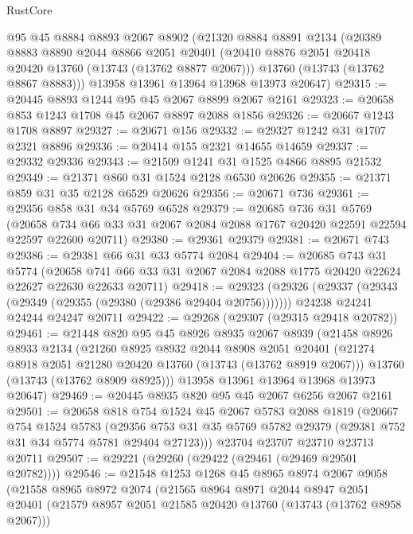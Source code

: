 \begin{lexlean}{RustCore}
\begin{coremodule}
    @95
    @45
    @8884
    @8893
    @2067
    @8902
    (@21320
      @8884
      @8891
      @2134
      (@20389
        @8883
        @8890
        @2044
        @8866
        @2051
        @20401
        (@20410 @8876 @2051 @20418 @20420 @13760 (@13743 (@13762 @8877 @2067)))
        @13760
        (@13743 (@13762 @8867 @8883)))
      @13958
      @13961
      @13964
      @13968
      @13973
      @20647)
@29315 := @20445 @8893 @1244 @95 @45 @2067 @8899 @2067 @2161
@29323 := @20658 @853 @1243 @1708 @45 @2067 @8897 @2088 @1856
@29326 := @20667 @1243 @1708 @8897
@29327 := @20671 @156
@29332 := @29327 @1242 @31 @1707 @2321 @8896
@29336 := @20414 @155 @2321 @14655 @14659
@29337 := @29332 @29336
@29343 := @21509 @1241 @31 @1525 @4866 @8895 @21532
@29349 := @21371 @860 @31 @1524 @2128 @6530 @20626
@29355 := @21371 @859 @31 @35 @2128 @6529 @20626
@29356 := @20671 @736
@29361 := @29356 @858 @31 @34 @5769 @6528
@29379 := @20685
    @736
    @31
    @5769
    (@20658 @734 @66 @33 @31 @2067 @2084 @2088 @1767 @20420 @22591 @22594 @22597 @22600 @20711)
@29380 := @29361 @29379
@29381 := @20671 @743
@29386 := @29381 @66 @31 @33 @5774 @2084
@29404 := @20685
    @743
    @31
    @5774
    (@20658 @741 @66 @33 @31 @2067 @2084 @2088 @1775 @20420 @22624 @22627 @22630 @22633 @20711)
@29418 := @29323
    (@29326 (@29337 (@29343 (@29349 (@29355 (@29380 (@29386 @29404 @20756)))))))
    @24238
    @24241
    @24244
    @24247
    @20711
@29422 := @29268 (@29307 (@29315 @29418 @20782))
@29461 := @21448
    @820
    @95
    @45
    @8926
    @8935
    @2067
    @8939
    (@21458
      @8926
      @8933
      @2134
      (@21260
        @8925
        @8932
        @2044
        @8908
        @2051
        @20401
        (@21274 @8918 @2051 @21280 @20420 @13760 (@13743 (@13762 @8919 @2067)))
        @13760
        (@13743 (@13762 @8909 @8925)))
      @13958
      @13961
      @13964
      @13968
      @13973
      @20647)
@29469 := @20445 @8935 @820 @95 @45 @2067 @6256 @2067 @2161
@29501 := @20658
    @818
    @754
    @1524
    @45
    @2067
    @5783
    @2088
    @1819
    (@20667
      @754
      @1524
      @5783
      (@29356 @753 @31 @35 @5769 @5782 @29379 (@29381 @752 @31 @34 @5774 @5781 @29404 @27123)))
    @23704
    @23707
    @23710
    @23713
    @20711
@29507 := @29221 (@29260 (@29422 (@29461 (@29469 @29501 @20782))))
@29546 := @21548
    @1253
    @1268
    @45
    @8965
    @8974
    @2067
    @9058
    (@21558
      @8965
      @8972
      @2074
      (@21565
        @8964
        @8971
        @2044
        @8947
        @2051
        @20401
        (@21579 @8957 @2051 @21585 @20420 @13760 (@13743 (@13762 @8958 @2067)))

\end{coremodule}
\end{lexlean}
